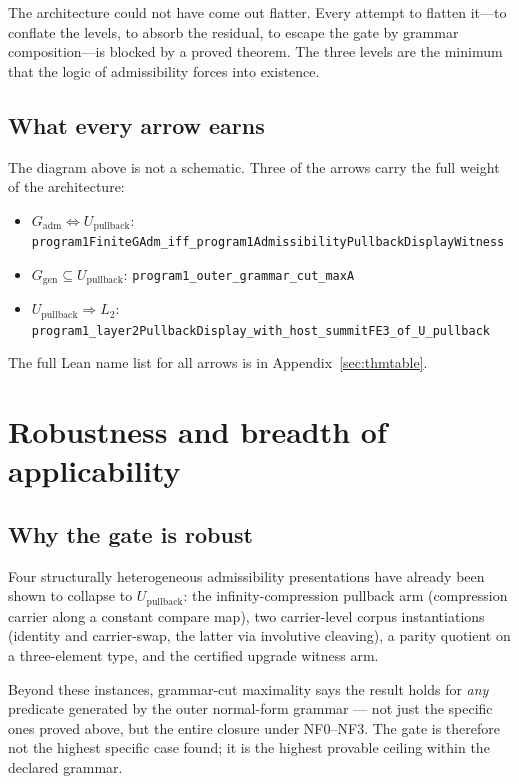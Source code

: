 \documentclass[11pt]{article}
\theoremstyle{plain}
\theoremstyle{definition}
\theoremstyle{remark}
\newcommand{\Gadm}{G_{\mathrm{adm}}}
\newcommand{\Upb}{U_{\mathrm{pullback}}}
\newcommand{\Ggen}{G_{\mathrm{gen}}}
\newcommand{\Stwo}{L_2}
\newcommand{\lean}[1]{\texttt{\small #1}}
\begin{document}
The architecture could not have come out flatter.  Every attempt to flatten
it---to conflate the levels, to absorb the residual, to escape the gate by
grammar composition---is blocked by a proved theorem.  The three levels are
the minimum that the logic of admissibility forces into existence.

\subsection{What every arrow earns}

The diagram above is not a schematic.  Three of the arrows carry the full
weight of the architecture:
\begin{itemize}
  \item $\Gadm \iff \Upb$:\newline
    \lean{program1FiniteGAdm\_iff\_program1Admissibility\-PullbackDisplayWitness}
  \item $\Ggen \subseteq \Upb$:\newline
    \lean{program1\_outer\_grammar\_cut\_maxA}
  \item $\Upb \Rightarrow \Stwo$:\newline
    \lean{program1\_layer2PullbackDisplay\_with\_host\_\-summitFE3\_of\_U\_pullback}
\end{itemize}
The full Lean name list for all arrows is in Appendix~\ref{sec:thmtable}.

\section{Robustness and breadth of applicability}
\label{sec:robustness}

\subsection{Why the gate is robust}

Four structurally heterogeneous admissibility presentations have already
been shown to collapse to $\Upb$: the infinity-compression pullback arm
(compression carrier along a constant compare map), two carrier-level
corpus instantiations (identity and carrier-swap, the latter via involutive
cleaving), a parity quotient on a three-element type, and the certified
upgrade witness arm.

Beyond these instances, grammar-cut maximality says the result holds for
\emph{any} predicate generated by the outer normal-form grammar --- not
just the specific ones proved above, but the entire closure under NF0--NF3.
The gate is therefore not the highest specific case found; it is the highest
provable ceiling within the declared grammar.
\end{document}

